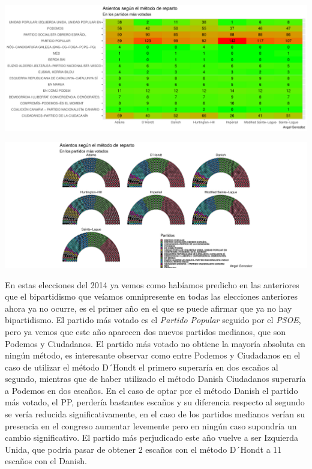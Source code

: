 \documentclass[12pt,a4paper,]{book}
\numberwithin{dummy}{section}
\theoremstyle{ocrenumbox}
\theoremstyle{blacknumex}
\theoremstyle{blacknumbox}
\theoremstyle{ocrenum}
\theoremstyle{ocrenum}
\begin{document}
\begin{center}\includegraphics[width=0.95\linewidth]{figurasR/unnamed-chunk-158-2} \end{center}

\begin{center}\includegraphics[width=0.95\linewidth]{figurasR/unnamed-chunk-158-3} \end{center}

En estas elecciones del 2014 ya vemos como habíamos predicho en las
anteriores que el bipartidismo que veíamos omnipresente en todas las
elecciones anteriores ahora ya no ocurre, es el primer año en el que se
puede afirmar que ya no hay bipartidismo. El partido más votado es el
\emph{Partido Popular} seguido por el \emph{PSOE}, pero ya vemos que
este año aparecen dos nuevos partidos medianos, que son Podemos y
Ciudadanos. El partido más votado no obtiene la mayoría absoluta en
ningún método, es interesante observar como entre Podemos y Ciudadanos
en el caso de utilizar el método D´Hondt el primero superaría en dos
escaños al segundo, mientras que de haber utilizado el método Danish
Ciudadanos superaría a Podemos en dos escaños. En el caso de optar por
el método Danish el partido más votado, el PP, perdería bastantes
escaños y su diferencia respecto al segundo se vería reducida
significativamente, en el caso de los partidos medianos verían su
presencia en el congreso aumentar levemente pero en ningún caso
supondría un cambio significativo. El partido más perjudicado este año
vuelve a ser Izquierda Unida, que podría pasar de obtener 2 escaños con
el método D´Hondt a 11 escaños con el Danish.
\end{document}
